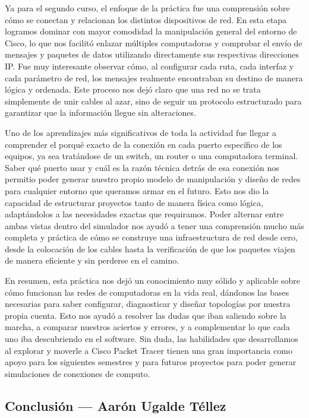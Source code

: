 Ya para el segundo curso, el enfoque de la práctica fue una comprensión sobre cómo se conectan y relacionan los distintos dispositivos de red. En esta etapa logramos dominar con mayor comodidad la manipulación general del entorno de Cisco, lo que nos facilitó enlazar múltiples computadoras y comprobar el envío de mensajes y paquetes de datos utilizando directamente sus respectivas direcciones IP. Fue muy interesante observar cómo, al configurar cada ruta, cada interfaz y cada parámetro de red, los mensajes realmente encontraban su destino de manera lógica y ordenada. Este proceso nos dejó claro que una red no se trata simplemente de unir cables al azar, sino de seguir un protocolo estructurado para garantizar que la información llegue sin alteraciones.

Uno de los aprendizajes más significativos de toda la actividad fue llegar a comprender el porqué exacto de la conexión en cada puerto específico de los equipos, ya sea tratándose de un switch, un router o una computadora terminal. Saber qué puerto usar y cuál es la razón técnica detrás de esa conexión nos permitio poder generar nuestro propio modelo de manipulación y diseño de redes para cualquier entorno que queramos armar en el futuro. Esto nos dio la capacidad de estructurar proyectos tanto de manera física como lógica, adaptándolos a las necesidades exactas que requiramos. Poder alternar entre ambas vistas dentro del simulador nos ayudó a tener una comprensión mucho más completa y práctica de cómo se construye una infraestructura de red desde cero, desde la colocación de los cables hasta la verificación de que los paquetes viajen de manera eficiente y sin perderse en el camino.

En resumen, esta práctica nos dejó un conocimiento muy sólido y aplicable sobre cómo funcionan las redes de computadoras en la vida real, dándonos las bases necesarias para saber configurar, diagnosticar y diseñar topologías por nuestra propia cuenta. Esto nos ayudó a resolver las dudas que iban saliendo sobre la marcha, a comparar nuestros aciertos y errores, y a complementar lo que cada uno iba descubriendo en el software. Sin duda, las habilidades que desarrollamos al explorar y moverle a Cisco Packet Tracer tienen una gran importancia como apoyo para los siguientes semestres y para futuros proyectos para poder generar simulaciones de conexiones de computo.
\clearpage
\subsection{Conclusión — Aarón Ugalde Téllez}
\label{sec:prac04:concl:aaron}

